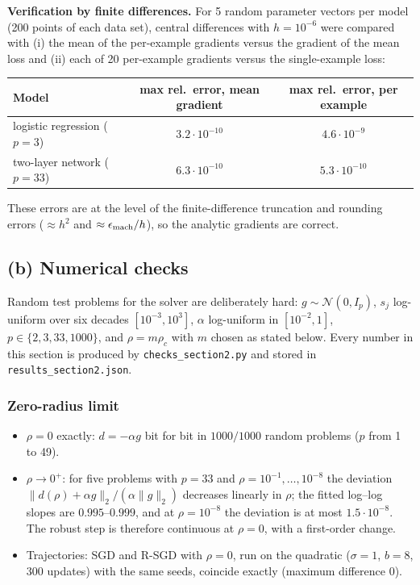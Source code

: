 \documentclass[11pt,a4paper]{article}
\newcommand{\norm}[1]{\lVert #1\rVert_2}
\begin{document}
\textbf{Verification by finite differences.} For 5 random parameter vectors per model
(200 points of each data set), central differences with $h=10^{-6}$ were compared
with (i) the mean of the per-example gradients versus the gradient of the mean loss
and (ii) each of 20 per-example gradients versus the single-example loss:

\begin{center}
\begin{tabular}{@{}lcc@{}}
\toprule
Model & max rel.\ error, mean gradient & max rel.\ error, per example \\
\midrule
logistic regression ($p=3$) & $3.2\cdot10^{-10}$ & $4.6\cdot10^{-9}$ \\
two-layer network ($p=33$) & $6.3\cdot10^{-10}$ & $5.3\cdot10^{-10}$ \\
\bottomrule
\end{tabular}
\end{center}
These errors are at the level of the finite-difference truncation and rounding errors
($\approx h^2$ and $\approx\epsilon_{\rm mach}/h$), so the analytic gradients are correct.

\subsection{(b) Numerical checks}\label{sec:checks}

Random test problems for the solver are deliberately hard: $g\sim\mathcal N(0,I_p)$,
$s_j$ log-uniform over six decades $[10^{-3},10^3]$, $\alpha$ log-uniform in
$[10^{-2},1]$, $p\in\{2,3,33,1000\}$, and $\rho=m\rho_c$ with $m$ chosen as stated
below. Every number in this section is produced by \texttt{checks\_section2.py} and
stored in \texttt{results\_section2.json}.

\subsubsection*{Zero-radius limit}
\begin{itemize}
\item $\rho=0$ exactly: $d=-\alpha g$ bit for bit in $1000/1000$ random problems
($p$ from 1 to 49).
\item $\rho\to0^+$: for five problems with $p=33$ and
$\rho=10^{-1},\dots,10^{-8}$ the deviation $\norm{d(\rho)+\alpha g}/(\alpha\norm g)$
decreases linearly in $\rho$; the fitted log--log slopes are $0.995$--$0.999$, and at
$\rho=10^{-8}$ the deviation is at most $1.5\cdot10^{-8}$. The robust step is
therefore continuous at $\rho=0$, with a first-order change.
\item Trajectories: SGD and R-SGD with $\rho=0$, run on the quadratic ($\sigma=1$,
$b=8$, 300 updates) with the same seeds, coincide exactly (maximum difference 0).
\end{itemize}
\end{document}
